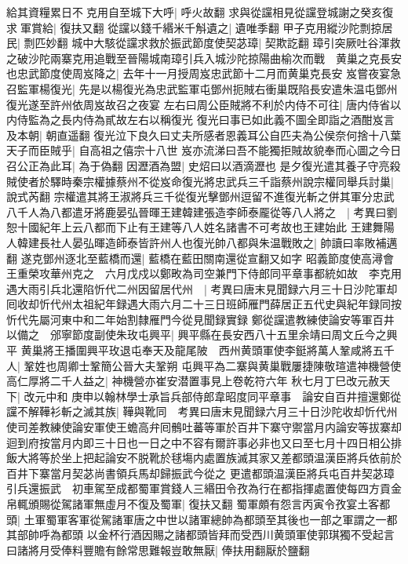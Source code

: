 給其資糧累日不克用自至城下大呼|{
	呼火故翻}
求與從讜相見從讜登城謝之癸亥復求軍賞給|{
	復扶又翻}
從讜以錢千緡米千斛遺之|{
	遺唯季翻}
甲子克用縱沙陀剽掠居民|{
	剽匹妙翻}
城中大駭從讜求救於振武節度使契苾璋|{
	契欺訖翻}
璋引突厥吐谷渾救之破沙陀兩寨克用追戰至晉陽城南璋引兵入城沙陀掠陽曲榆次而戰　黄巢之克長安也忠武節度使周岌降之|{
	去年十一月授周岌忠武節十二月而黄巢克長安}
岌嘗夜宴急召監軍楊復光|{
	先是以楊復光為忠武監軍屯鄧州扼賊右衝巢既陷長安遣朱温屯鄧州復光遂至許州依周岌故召之夜宴}
左右曰周公臣賊將不利於内侍不可往|{
	唐内侍省以内侍監為之長内侍為貳故左右以稱復光}
復光曰事已如此義不圖全即詣之酒酣岌言及本朝|{
	朝直遥翻}
復光泣下良久曰丈夫所感者恩義耳公自匹夫為公侯奈何捨十八葉天子而臣賊乎|{
	自高祖之僖宗十八世}
岌亦流涕曰吾不能獨拒賊故貌奉而心圖之今日召公正為此耳|{
	為于偽翻}
因瀝酒為盟|{
	史炤曰以酒滴瀝也}
是夕復光遣其養子守亮殺賊使者於驛時秦宗權據蔡州不從岌命復光將忠武兵三千詣蔡州說宗權同舉兵討巢|{
	說式芮翻}
宗權遣其將王淑將兵三千從復光擊鄧州逗留不進復光斬之併其軍分忠武八千人為八都遣牙將鹿晏弘晉暉王建韓建張造李師泰龎從等八人將之　|{
	考異曰劉恕十國紀年上云八都而下止有王建等八人姓名諸書不可考故也王建始此}
王建舞陽人韓建長社人晏弘暉造師泰皆許州人也復光帥八都與朱温戰敗之|{
	帥讀曰率敗補邁翻}
遂克鄧州逐北至藍橋而還|{
	藍橋在藍田關南還從宣翻又如字}
昭義節度使高潯會王重榮攻華州克之　六月戊戍以鄭畋為司空兼門下侍郎同平章事都統如故　李克用遇大雨引兵北還陷忻代二州因留居代州　|{
	考異曰唐末見聞録六月三十日沙陀軍却囘收却忻代州太祖紀年録遇大雨六月二十三日班師雁門薛居正五代史與紀年録同按忻代先屬河東中和二年始割隸雁門今從見聞録實録}
鄭從讜遣教練使論安等軍百井以備之　邠寧節度副使朱玫屯興平|{
	興平縣在長安西八十五里余靖曰周文丘今之興平}
黄巢將王播圍興平玫退屯奉天及龍尾陂　西州黄頭軍使李鋌將萬人鞏咸將五千人|{
	鞏姓也周卿士鞏簡公晉大夫鞏朔}
屯興平為二寨與黄巢戰屢捷陳敬瑄遣神機營使高仁厚將二千人益之|{
	神機營亦崔安潜置事見上卷乾符六年}
秋七月丁巳改元赦天下|{
	改元中和}
庚申以翰林學士承旨兵部侍郎韋昭度同平章事　論安自百井擅還鄭從讜不解鞾衫斬之滅其族|{
	鞾與靴同　考異曰唐末見聞録六月三十日沙陀收却忻代州使司差教練使論安軍使王蟾高弁囘鶻吐蕃等軍於百井下寨守禦當月内論安等拔寨却迴到府按當月内即三十日也一日之中不容有爾許事必非也又曰至七月十四日相公排飯大將等於坐上把起論安不脱靴於毬塲内處置族滅其家又差都頭温漢臣將兵依前於百井下寨當月契苾尚書領兵馬却歸振武今從之}
更遣都頭温漢臣將兵屯百井契苾璋引兵還振武　初車駕至成都蜀軍賞錢人三緡田令孜為行在都指揮處置使每四方貢金帛輒頒賜從駕諸軍無虛月不復及蜀軍|{
	復扶又翻}
蜀軍頗有怨言丙寅令孜宴土客都頭|{
	土軍蜀軍客軍從駕諸軍唐之中世以諸軍總帥為都頭至其後也一部之軍謂之一都其部帥呼為都頭}
以金杯行酒因賜之諸都頭皆拜而受西川黄頭軍使郭琪獨不受起言曰諸將月受俸料豐贍有餘常思難報豈敢無厭|{
	俸扶用翻厭於鹽翻}
